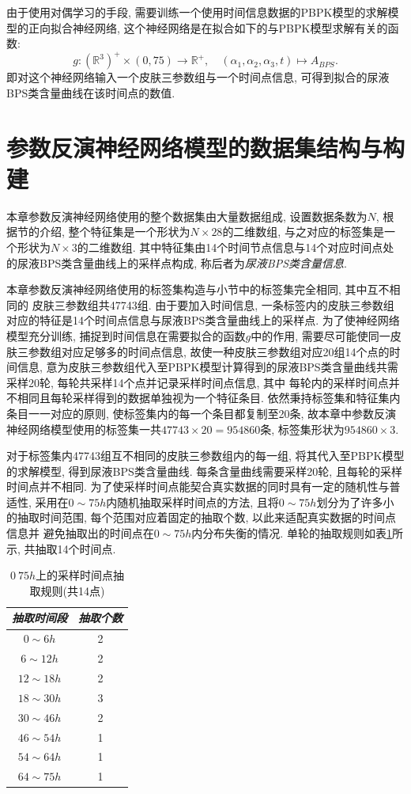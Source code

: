 \documentclass[a4paper,punct=banjiao,twoside]{ctexrep}
\theoremstyle{plain}
\theoremstyle{definition}
\theoremstyle{remark}
\begin{document}
由于使用对偶学习的手段, 需要训练一个使用时间信息数据的PBPK模型的求解模型的正向拟合神经网络, 这个神经网络是在拟合如下的与PBPK模型求解有关的函数:
\begin{equation}
\label{eq3.1}
g:(\mathbb{R}^3)^{+}\times (0,75) \to \mathbb{R}^{+},\quad (\alpha_1,\alpha_2,\alpha_3, t)\mapsto A_{BPS}.
\end{equation}
即对这个神经网络输入一个皮肤三参数组与一个时间点信息, 可得到拟合的尿液BPS类含量曲线在该时间点的数值. 


\section{参数反演神经网络模型的数据集结构与构建}
本章参数反演神经网络使用的整个数据集由大量数据组成, 设置数据条数为$N$, 根据\label{4.1}节的介绍, 整个特征集是一个形状为$N \times 28$的二维数组,  与之对应的标签集是一个形状为$N \times 3$的二维数组. 
其中特征集由14个时间节点信息与14个对应时间点处的尿液BPS类含量曲线上的采样点构成, 称后者为\textit{尿液BPS类含量信息}. 

本章参数反演神经网络使用的标签集构造与\label{3.2.1}小节中的标签集完全相同, 其中互不相同的
皮肤三参数组共47743组. 
由于要加入时间信息, 一条标签内的皮肤三参数组对应的特征是14个时间点信息与尿液BPS类含量曲线上的采样点.  为了使神经网络模型充分训练, 捕捉到时间信息在需要拟合的函数$g$中的作用, 
需要尽可能使同一皮肤三参数组对应足够多的时间点信息, 故使一种皮肤三参数组对应20组14个点的时间信息, 意为皮肤三参数组代入至PBPK模型计算得到的尿液BPS类含量曲线共需采样20轮, 每轮共采样14个点并记录采样时间点信息, 其中
每轮内的采样时间点并不相同且每轮采样得到的数据单独视为一个特征条目. 依然秉持标签集和特征集内条目一一对应的原则, 使标签集内的每一个条目都复制至20条, 故本章中参数反演神经网络模型使用的标签集一共$47743\times 20 = 954860$条, 
标签集形状为$954860\times 3$.

对于标签集内47743组互不相同的皮肤三参数组内的每一组, 将其代入至PBPK模型的求解模型, 得到尿液BPS类含量曲线. 每条含量曲线需要采样20轮, 且每轮的采样时间点并不相同.
为了使采样时间点能契合真实数据的同时具有一定的随机性与普适性, 采用在$0\sim 75h$内随机抽取采样时间点的方法, 且将$0\sim 75h$划分为了许多小的抽取时间范围, 每个范围对应着固定的抽取个数, 以此来适配真实数据的时间点信息并
避免抽取出的时间点在$0\sim 75h$内分布失衡的情况. 单轮的抽取规则如表\ref{tab5}所示, 共抽取14个时间点.

\begin{table}[htbp]
  \centering
  \begin{tabular}[t]{c*{1}{c}}
    \hline
    \textit{抽取时间段} & \textit{抽取个数}\\
    \hline
    $0\sim 6h$&  2 \\ 
    $6\sim 12h$&  2 \\ 
    $12\sim 18h$&  2 \\ 
    $18\sim 30h$&  3 \\ 
    $30\sim 46h$&  2 \\ 
    $46\sim 54h$&  1 \\ 
    $54\sim 64h$&  1 \\ 
    $64\sim 75h$&  1 \\ 
    \hline
  \end{tabular}
  \caption{\label{tab5}$0~75h$上的采样时间点抽取规则(共14点)} 
\end{table}  
\end{document}
